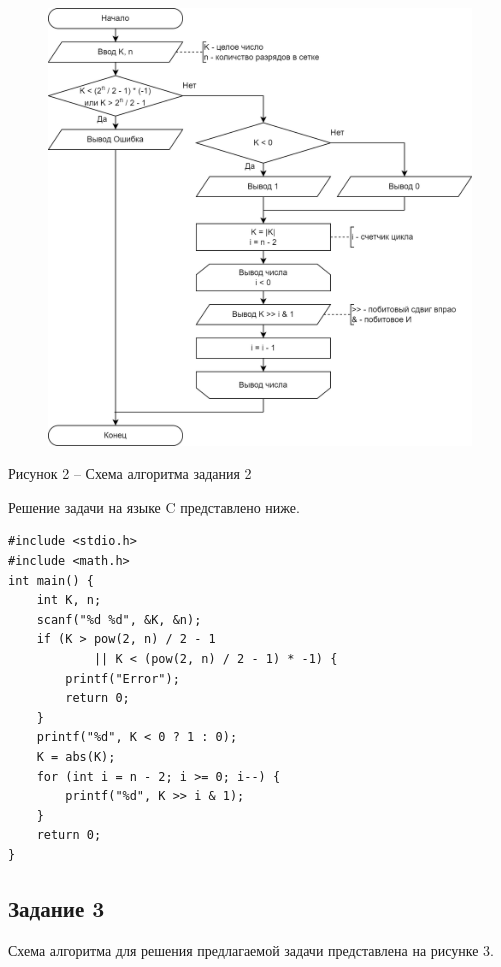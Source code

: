 \documentclass[a4paper,14pt]{extarticle}
\begin{document}
	\begin{figure}[h]
		\centering
		\includegraphics[width=0.8\linewidth]{schemes/s-2}
	\end{figure}
	\begin{center}
		Рисунок 2 – Схема алгоритма задания 2
	\end{center}
	\pagebreak
	
	Решение задачи на языке C представлено ниже.
	
	\begin{lstlisting}[tabsize=2,basicstyle=\ttfamily]
#include <stdio.h>
#include <math.h>
int main() {
	int K, n;
	scanf("%d %d", &K, &n);
	if (K > pow(2, n) / 2 - 1 
			|| K < (pow(2, n) / 2 - 1) * -1) {
		printf("Error");
		return 0;
	}
	printf("%d", K < 0 ? 1 : 0);
	K = abs(K);
	for (int i = n - 2; i >= 0; i--) {
		printf("%d", K >> i & 1);
	}
	return 0;
}
	\end{lstlisting}
	
	\pagebreak
	\subsection*{Задание 3}
	Схема алгоритма для решения предлагаемой задачи представлена на рисунке 3.
	
\end{document}
